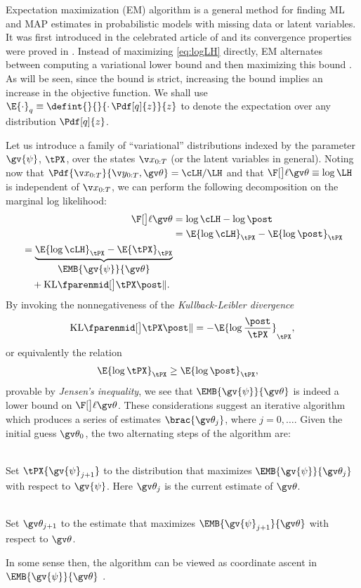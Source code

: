 
Expectation maximization (EM) algorithm is a general
method for finding ML and MAP estimates in probabilistic models with missing data or
latent variables. It was first introduced in
the celebrated article of \textcite{Dempster1977} and its 
convergence properties were proved in \textcite{Wu1983}
. Instead of maximizing
\eqref{eq:logLH} directly, EM alternates between computing a variational lower bound and then maximizing this bound
\parencite{Bishop2006,barber2012bayesian}. As will be seen, since the bound is strict, increasing the bound implies
an increase in the objective function.
We shall use $\E{\cdot}_{q}\equiv\defint{}{}{\cdot\,\Pdf[q]{z}}{z}$ to denote the expectation
over any distribution $\Pdf[q]{z}$.

Let us introduce a family of ``variational'' distributions 
indexed by the parameter $\gv{\psi}$, $\tPX$, over the states $\X$ (or the latent variables in general).
Noting now that $\Pdf{\X}{\Y,\Th}=\cLH/\LH$ and that $\lLH\equiv\log\LH$ is independent of $\X$, we can perform the
following decomposition on the marginal log likelihood:
\begin{align}
	\lLH &= \log\cLH - \log\post \nonumber\\
	&= \E{\log\cLH}_{\tPX} - \E{\log\post}_{\tPX} \nonumber\\ 
	\begin{split}
	&=\underbrace{\E{\log\cLH}_{\tPX} - \E{\tPX}_{\tPX}}_{\displaystyle \EMB{\gv{\psi}}{\Th}}\\
	&\quad+\KL{\tPX}{\post}. 
	\end{split}
	\label{eq:lLH_decomp}
\end{align}
By invoking the nonnegativeness of
the \emph{Kullback-Leibler divergence}
\begin{align}
		\KL{\tPX}{\post} = -\E{\log{\frac{\post}{\tPX}}}_{\tPX},  
\end{align}
or equivalently the relation
\begin{align}
	\E{\log\tPX}_{\tPX} &\geq \E{\log\post}_{\tPX},	
\end{align}
provable by \emph{Jensen's inequality}, 
we see that $\EMB{\gv{\psi}}{\Th}$ is indeed a lower bound on $\lLH$. 
These considerations suggest an iterative algorithm
which produces a series of estimates $\brac{\Th_j}$, where $j=0,\dots$.
Given the initial guess $\Th_0$, the two alternating
steps of the algorithm are:
%
\begin{description}
\addtolength{\leftskip}{1cm}
  \item[E-step]\hfill\\
  Set $\tPX{\gv{\psi}_{j+1}}$ to the distribution that maximizes $\EMB{\gv{\psi}}{\Th_j}$
  with respect to $\gv{\psi}$. Here $\Th_j$ is the current estimate of $\Th$.  
  \item[M-step]\hfill\\ 
  Set $\Th_{j+1}$ to the estimate that maximizes $\EMB{\gv{\psi}_{j+1}}{\Th}$ with respect to $\Th$.
\end{description}%
In some sense then, the algorithm can be viewed as coordinate ascent in $\EMB{\gv{\psi}}{\Th}$ \parencite{Neala1998}. 

